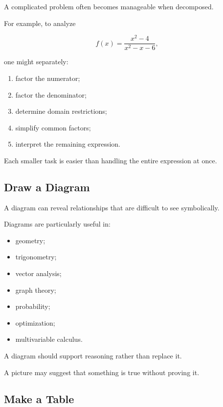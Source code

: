 A complicated problem often becomes manageable when decomposed.

For example, to analyze

\[ f(x)=\frac{x^2-4}{x^2-x-6}, \]

one might separately:

\begin{enumerate}
    \item factor the numerator;
    \item factor the denominator;
    \item determine domain restrictions;
    \item simplify common factors;
    \item interpret the remaining expression.
\end{enumerate}

Each smaller task is easier than handling the entire expression at once.

\subsection{Draw a Diagram}
\label{subsec:draw-diagram}

A diagram can reveal relationships that are difficult to see symbolically.

Diagrams are particularly useful in:

\begin{itemize}
    \item geometry;
    \item trigonometry;
    \item vector analysis;
    \item graph theory;
    \item probability;
    \item optimization;
    \item multivariable calculus.
\end{itemize}

A diagram should support reasoning rather than replace it.

A picture may suggest that something is true without proving it.

\subsection{Make a Table}
\label{subsec:make-table}

